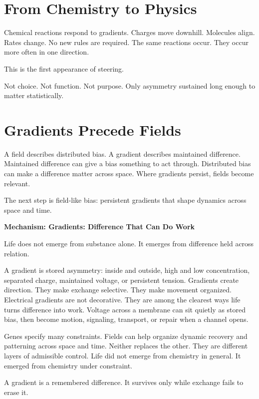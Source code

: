 \documentclass[11pt,twoside,openright]{book}
\newenvironment{mechanismbox}[1]
  {\begin{framed}\noindent\textbf{Mechanism: #1}\par\medskip}
  {\end{framed}}
\begin{document}
\section*{From Chemistry to Physics}

Chemical reactions respond to gradients. Charges move downhill. Molecules align. Rates change. No new rules are required. The same reactions occur. They occur more often in one direction.

This is the first appearance of steering.

Not choice. Not function. Not purpose. Only asymmetry sustained long enough to matter statistically.

\section*{Gradients Precede Fields}

A field describes distributed bias. A gradient describes maintained difference. Maintained difference can give a bias something to act through. Distributed bias can make a difference matter across space. Where gradients persist, fields become relevant.

The next step is field-like bias: persistent gradients that shape dynamics across space and time.

\begin{mechanismbox}{Gradients: Difference That Can Do Work}
Life does not emerge from substance alone.
It emerges from difference held across relation.

A gradient is stored asymmetry: inside and outside, high and low concentration, separated charge, maintained voltage, or persistent tension. Gradients create direction. They make exchange selective. They make movement organized. Electrical gradients are not decorative. They are among the clearest ways life turns difference into work. Voltage across a membrane can sit quietly as stored bias, then become motion, signaling, transport, or repair when a channel opens.

Genes specify many constraints. Fields can help organize dynamic recovery and patterning across space and time. Neither replaces the other. They are different layers of admissible control. Life did not emerge from chemistry in general. It emerged from chemistry under constraint.

A gradient is a remembered difference.
It survives only while exchange fails to erase it.
\end{mechanismbox}
\end{document}
